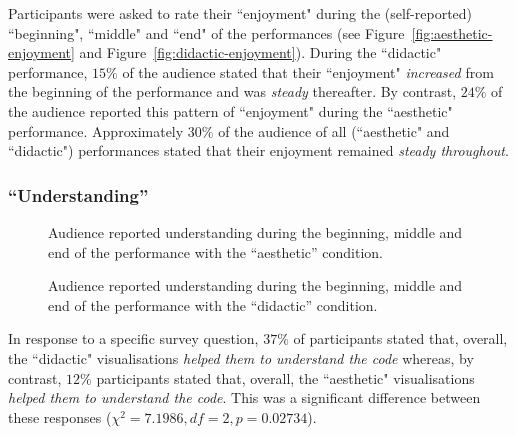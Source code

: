 \documentclass{sig-alternate}
\begin{document}
Participants were asked to rate their ``enjoyment" during the (self-reported) ``beginning", ``middle" and ``end" of the performances (see Figure~\ref{fig:aesthetic-enjoyment} and Figure~\ref{fig:didactic-enjoyment}). During the ``didactic" performance, $15\%$ of the audience stated that their ``enjoyment" {\it increased} from the beginning of the performance and was {\it steady} thereafter. By contrast, $24\%$ of the audience reported this pattern of ``enjoyment" during the ``aesthetic" performance. Approximately $30\%$ of the audience of all (``aesthetic" and ``didactic") performances stated that their enjoyment remained {\it steady throughout}.

\subsubsection{``Understanding''}

\begin{figure}
\centering
{}
\caption{Audience reported understanding during the beginning, middle and end of the performance with the ``aesthetic'' condition.}
\label{fig:aesthetic-understanding}
\end{figure}

\begin{figure}
\centering
{}
\caption{Audience reported understanding during the beginning, middle and end of the performance with the ``didactic'' condition.}
\label{fig:didactic-understanding}
\end{figure}

In response to a specific survey question, $37\%$ of participants stated that, overall, the ``didactic" visualisations {\it helped them to understand the code} whereas, by contrast, $12\%$ participants stated that, overall, the ``aesthetic" visualisations {\it helped them to understand the code}. This was a significant difference between these responses ($\chi^2=7.1986,df=2,p=0.02734$).
\end{document}
